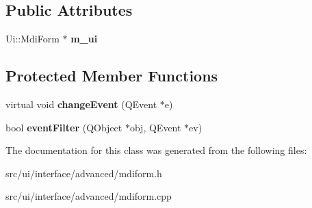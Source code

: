 \subsection*{Public Attributes}
\begin{DoxyCompactItemize}
\item 
\hypertarget{classMdiForm_adee2acb6d8de2c8c6bdf8fa3d3297890}{
Ui::MdiForm $\ast$ {\bfseries m\_\-ui}}
\label{classMdiForm_adee2acb6d8de2c8c6bdf8fa3d3297890}

\end{DoxyCompactItemize}
\subsection*{Protected Member Functions}
\begin{DoxyCompactItemize}
\item 
\hypertarget{classMdiForm_a77ed93185f26e9c63659980e65f0ef3b}{
virtual void {\bfseries changeEvent} (QEvent $\ast$e)}
\label{classMdiForm_a77ed93185f26e9c63659980e65f0ef3b}

\item 
\hypertarget{classMdiForm_a3b1b4d1f6b6def0dbd0bd72fdefb5798}{
bool {\bfseries eventFilter} (QObject $\ast$obj, QEvent $\ast$ev)}
\label{classMdiForm_a3b1b4d1f6b6def0dbd0bd72fdefb5798}

\end{DoxyCompactItemize}


The documentation for this class was generated from the following files:\begin{DoxyCompactItemize}
\item 
src/ui/interface/advanced/mdiform.h\item 
src/ui/interface/advanced/mdiform.cpp\end{DoxyCompactItemize}
